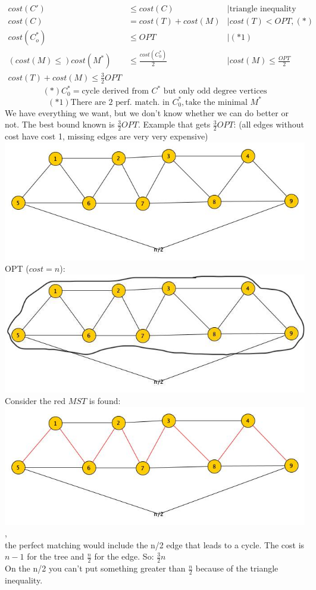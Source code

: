  \begin{align*}
 	cost(C') &\leq cost(C) & |\text{triangle inequality}\\
 	cost(C) &= cost(T) + cost(M) & |cost(T) < OPT,(*)  \\
 	cost(C_o^*) &\leq OPT & | (*1)	\\
 	(cost(M) \leq)cost(M^*) &\leq \frac{cost(C_0^*)}{2} & |cost(M) \leq \frac{OPT}{2} \\
 	cost(T) + cost(M) \leq \frac{3}{2}OPT
 \end{align*}
$$(*) C_0^* = \text{cycle derived from $C^*$ but only odd degree vertices}$$
$$(*1) \text{There are 2 perf. match. in } C_0^*, \text{take the minimal } M^*$$
We have everything we want, but we don't know whether we can do better or not. The best bound known is $\frac{3}{2}OPT$. Example that gets $\frac{3}{2}OPT$: (all edges without cost have cost 1, missing edges are very very expensive) \\
\includegraphics[scale=0.25]{img/graph24}
\\ OPT ($cost = n$): \\ \includegraphics[scale=0.25]{img/graph25} \\
Consider the red $MST$ is found: \\ \includegraphics[scale=0.25]{img/graph26},\\ the perfect matching would include the n/2 edge that leads to a cycle. The cost is $n-1$ for the tree and $\frac{n}{2}$ for the edge. So: $\frac{3}{2}n$ \\
On the n/2 you can't put something greater than $\frac{n}{2}$ because of the triangle inequality. 
